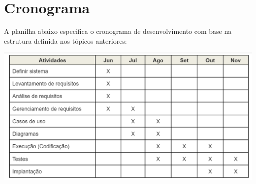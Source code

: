 \chapter{Cronograma}
A planilha abaixo especifica o cronograma de desenvolvimento com base na estrutura definida nos tópicos anteriores:

\includegraphics[scale=0.5]{imagens/cronograma.png}